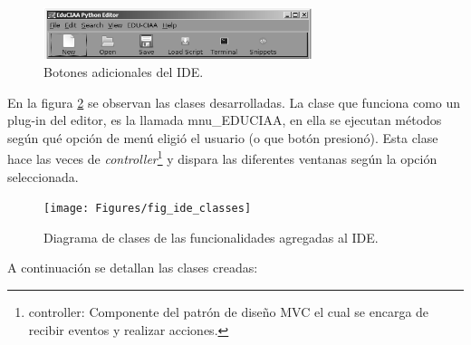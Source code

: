 \begin{figure}[ht]
  \centering
    \includegraphics[width=0.7\textwidth]{Figures/fig_ide_buttons}
  \caption{Botones adicionales del IDE.}
  \label{fig:idebuttons}
\end{figure}

En la figura \ref{fig:ideclasses} se observan las clases desarrolladas. La clase que funciona como un plug-in del editor, es la llamada mnu\_EDUCIAA, en ella se ejecutan métodos según qué opción de menú eligió el usuario (o que botón presionó). Esta clase hace las veces de \textit{controller}\footnote{controller: Componente del patrón de diseño MVC el cual se encarga de recibir eventos y realizar acciones.} y dispara las diferentes ventanas según la opción seleccionada.

\begin{figure}[ht]
  \centering
    \texttt{[image: Figures/fig\_ide\_classes]}
  \caption{Diagrama de clases de las funcionalidades agregadas al IDE.}
  \label{fig:ideclasses}
\end{figure}

 A continuación se detallan las clases creadas:

